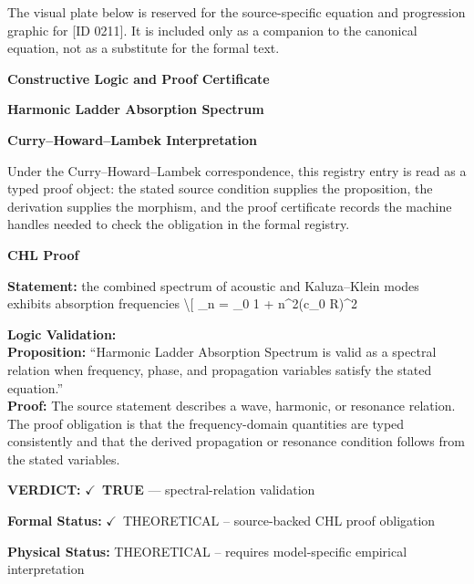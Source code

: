\begingroup\footnotesize\sloppy
The visual plate below is reserved for the source-specific equation and progression graphic for [ID 0211]. It is included only as a companion to the canonical equation, not as a substitute for the formal text.
\par\endgroup
\ifTZPDarkEdition
{}
\fi

\clearpage
\begingroup\tzpsupportsetup
\noindent\textbf{\fontsize{10.8pt}{12.8pt}\selectfont [ID 0211] Constructive Logic and Proof Certificate}\par
\noindent\textbf{\fontsize{10pt}{12pt}\selectfont Harmonic Ladder Absorption Spectrum}\par
\vspace{0.45em}
\begingroup
\footnotesize
\setlength{\parskip}{0.22em}
\setlength{\parindent}{0pt}
\noindent\textbf{Curry--Howard--Lambek Interpretation}\par
Under the Curry--Howard--Lambek correspondence, this registry entry is read as a typed proof
object: the stated source condition supplies the proposition, the derivation supplies the
morphism, and the proof certificate records the machine handles needed to check the obligation
in the formal registry.

\vspace{0.45em}
\noindent\textbf{CHL Proof}\par
\textbf{Statement:} the combined spectrum of acoustic and Kaluza--Klein modes exhibits absorption
frequencies \textbackslash{}[ \_n = \_0 1 + n\textasciicircum{}2(c\_0 R)\textasciicircum{}2

\textbf{Logic Validation:}\\
\textbf{Proposition:} ``Harmonic Ladder Absorption Spectrum is valid as a spectral relation when frequency,
phase, and propagation variables satisfy the stated equation.''\\
\textbf{Proof:} The source statement describes a wave, harmonic, or resonance relation. The proof
obligation is that the frequency-domain quantities are typed consistently and that the
derived propagation or resonance condition follows from the stated variables.

\textbf{VERDICT:} \ensuremath{\checkmark}\ \textbf{TRUE} --- spectral-relation validation

\textbf{Formal Status:} \ensuremath{\checkmark}\ THEORETICAL -- source-backed CHL proof obligation

\textbf{Physical Status:} THEORETICAL -- requires model-specific empirical interpretation
\par\vspace{0.45em}
\par
\ifTZPDarkEdition
{}
\fi
\endgroup
\endgroup
